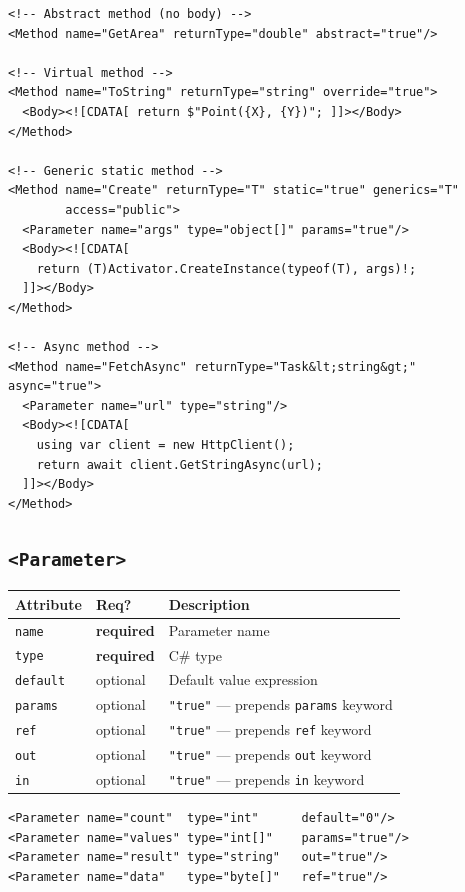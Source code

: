 \documentclass[11pt,a4paper]{article}
\newcommand{\el}[1]{\texttt{\textcolor{xoop-keyword}{<#1>}}}
\newcommand{\attr}[1]{\texttt{\textcolor{xoop-attr}{#1}}}
\newcommand{\val}[1]{\texttt{\textcolor{xoop-string}{"#1"}}}
\newcommand{\cs}[1]{\texttt{#1}}
\newcommand{\required}{\textcolor{xoop-red}{\textbf{required}}}
\newcommand{\optional}{\textcolor{xoop-green}{optional}}
\begin{document}
\begin{lstlisting}[caption={Method examples}]
<!-- Abstract method (no body) -->
<Method name="GetArea" returnType="double" abstract="true"/>

<!-- Virtual method -->
<Method name="ToString" returnType="string" override="true">
  <Body><![CDATA[ return $"Point({X}, {Y})"; ]]></Body>
</Method>

<!-- Generic static method -->
<Method name="Create" returnType="T" static="true" generics="T"
        access="public">
  <Parameter name="args" type="object[]" params="true"/>
  <Body><![CDATA[
    return (T)Activator.CreateInstance(typeof(T), args)!;
  ]]></Body>
</Method>

<!-- Async method -->
<Method name="FetchAsync" returnType="Task&lt;string&gt;" async="true">
  <Parameter name="url" type="string"/>
  <Body><![CDATA[
    using var client = new HttpClient();
    return await client.GetStringAsync(url);
  ]]></Body>
</Method>
\end{lstlisting}

\subsection{\el{Parameter}}

\begin{center}
\begin{tabularx}{\linewidth}{llX}
\toprule
Attribute & Req? & Description \\
\midrule
\attr{name}    & \required & Parameter name \\
\attr{type}    & \required & C\# type \\
\attr{default} & \optional & Default value expression \\
\attr{params}  & \optional & \val{true} — prepends \cs{params} keyword \\
\attr{ref}     & \optional & \val{true} — prepends \cs{ref} keyword \\
\attr{out}     & \optional & \val{true} — prepends \cs{out} keyword \\
\attr{in}      & \optional & \val{true} — prepends \cs{in} keyword \\
\bottomrule
\end{tabularx}
\end{center}

\begin{lstlisting}[caption={Parameter modifiers}]
<Parameter name="count"  type="int"      default="0"/>
<Parameter name="values" type="int[]"    params="true"/>
<Parameter name="result" type="string"   out="true"/>
<Parameter name="data"   type="byte[]"   ref="true"/>
\end{lstlisting}
\end{document}
